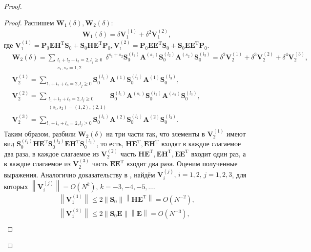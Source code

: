 \documentclass[specialist,
               substylefile = spbu_report.rtx,
               subf,href,colorlinks=true, 12pt]{disser}
\newcommand\norm[1]{\left\|#1\right\|}
\begin{document}
\begin{proof}
\begin{proof}
	Распишем $\mathbf{W}_1(\delta), \mathbf{W}_2(\delta)$:
	\begin{align*}
		\mathbf{W}_1(\delta)=\delta \mathbf{V}_1^{(1)}+\delta^2\mathbf{V}_1^{(2)},
	\end{align*}
	где $\mathbf{V}_1^{(1)}=\mathbf{P}_0\mathbf{EH}^\mathrm{T}\mathbf{S}_0+\mathbf{S}_0\mathbf{HE}^\mathrm{T}\mathbf{P}_0, \mathbf{V}_1^{(2)}=\mathbf{P}_0\mathbf{EE}^\mathrm{T}\mathbf{S}_0+\mathbf{S}_0\mathbf{EE}^\mathrm{T}\mathbf{P}_0$.
	\begin{align*}
		&\mathbf{W}_2(\delta) = \sum_{\substack{l_1+l_2+l_3=2,l_j\geqslant0\\s_1,s_2=1,2}}\delta^{s_1+s_2}\mathbf{S}_0^{(l_1)}\mathbf{A}^{(s_1)}\mathbf{S}_0^{(l_2)}\mathbf{A}^{(s_2)}\mathbf{S}_0^{(l_3)}=\delta^2\mathbf{V}_2^{(1)}+\delta^3\mathbf{V}_2^{(2)}+\delta^4\mathbf{V}_2^{(3)},\\
		&\mathbf{V}_2^{(1)}=\sum_{l_1+l_2+l_3=2,l_j\geqslant0}\mathbf{S}_0^{(l_1)}\mathbf{A}^{(1)}\mathbf{S}_0^{(l_2)}\mathbf{A}^{(1)}\mathbf{S}_0^{(l_3)},\\
		&\mathbf{V}_2^{(2)}=\sum_{\substack{l_1+l_2+l_3=2,l_j\geqslant0\\(s_1,s_2)=(1,2),(2,1)}}\mathbf{S}_0^{(l_1)}\mathbf{A}^{(s_1)}\mathbf{S}_0^{(l_2)}\mathbf{A}^{(s_2)}\mathbf{S}_0^{(l_3)},\\
		&\mathbf{V}_2^{(3)}=\sum_{l_1+l_2+l_3=2,l_j\geqslant0}\mathbf{S}_0^{(l_1)}\mathbf{A}^{(2)}\mathbf{S}_0^{(l_2)}\mathbf{A}^{(2)}\mathbf{S}_0^{(l_3)}.
	\end{align*}
	Таким образом, разбили $\mathbf{W}_2(\delta)$ на три части так, что элементы в $\mathbf{V}_2^{(1)}$ имеют вид $\mathbf{S}_0^{(l_1)}\mathbf{HE}^\mathrm{T}\mathbf{S}_0^{(l_2)}\mathbf{EH}^\mathrm{T}\mathbf{S}_0^{(l_3)}$, то есть, $\mathbf{HE}^\mathrm{T},\mathbf{EH}^\mathrm{T}$ входят в каждое слагаемое два раза, в каждое слагаемое из $\mathbf{V}_2^{(2)}$ часть $\mathbf{HE}^\mathrm{T},\mathbf{EH}^\mathrm{T},\mathbf{EE}^\mathrm{T}$ входит один раз, а в каждое слагаемое из $\mathbf{V}_2^{(3)}$ часть $\mathbf{EE}^\mathrm{T}$ входит два раза. Оценим полученные выражения. Аналогично доказательству в \cite{ZNekrutkin}, найдём $\mathbf{V}_i^{(j)},\, i=1,2,\, j=1,2,3$, для которых $\norm{\mathbf{V}_i^{(j)}}=O(N^{k}),\, k=-3,-4,-5,\dots$. 
	\begin{align*}
		\norm{\mathbf{V}_1^{(1)}}\leqslant 2\norm{\mathbf{S}_0}\norm{\mathbf{HE}^\mathrm{T}}=O(N^{-2}),\\
		\norm{\mathbf{V}_1^{(2)}}\leqslant 2\norm{\mathbf{S}_0\mathbf{E}}\norm{\mathbf{E}}=O(N^{-3}),\\

\end{align*}
\end{proof}
\end{proof}
\end{document}
